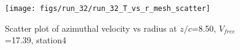 \begin{figure}[H]
\centering
\texttt{[image: figs/run\_32/run\_32\_T\_vs\_r\_mesh\_scatter]}
\caption{Scatter plot of azimuthal velocity vs radius at $z/c$=8.50, $V_{free}$=17.39, station4}
\label{fig:run_32_T_vs_r_mesh_scatter}
\end{figure}


